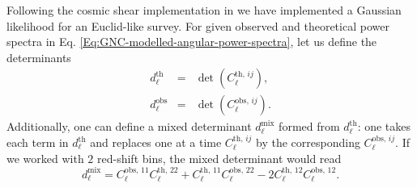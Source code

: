 Following the cosmic shear implementation in \cite{Audren:2012vy} we have implemented a Gaussian likelihood for an Euclid-like survey. For given observed and theoretical power spectra in Eq. \eqref{Eq:GNC-modelled-angular-power-spectra}, let us define the determinants
\begin{eqnarray}
\label{Eq:determinants-Gaussian-likelihood}
d_\ell^{\mathrm{th}} & = & \det \left( C_\ell^{\mathrm{th},\,ij}\right),\\
d_\ell^{\mathrm{obs}} & = & \det \left( C_\ell^{\mathrm{obs},\,ij}\right). 
\end{eqnarray}
Additionally, one can define a mixed determinant $d_\ell^{\mathrm{mix}}$ formed from $d_\ell^{\mathrm{th}}$: one takes each term in $d_\ell^{\mathrm{th}}$ and replaces one at a time $C_\ell^{\mathrm{th},\,ij}$ by the corresponding $C_\ell^{\mathrm{obs},\,ij}$. If we worked with $2$ red-shift bins, the mixed determinant would read
\begin{equation}
\label{Eq:example-mixed-determinant}
d_\ell^{\mathrm{mix}} = C_\ell^{\mathrm{obs},\,11}C_\ell^{\mathrm{th},\,22} + C_\ell^{\mathrm{th},\,11}C_\ell^{\mathrm{obs},\,22} - 2 C_\ell^{\mathrm{th},\,12}C_\ell^{\mathrm{obs},\,12}.
\end{equation}
                        
